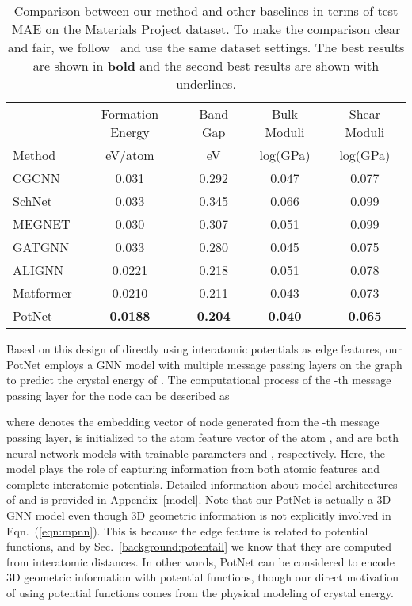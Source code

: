 \documentclass[nohyperref]{article}
\theoremstyle{plain}
\theoremstyle{definition}
\theoremstyle{remark}
\begin{document}
\begin{table*}[t]
\caption{Comparison between our method and other baselines in terms of test MAE on the Materials Project dataset. To make the comparison clear and fair, we follow~\citet{yan2022periodic} and use the same dataset settings. The best results are shown in \textbf{bold} and the second best results are shown with \underline{underlines}.}
\label{tb:mp}
\begin{center}
\begin{tabular}{l|cccc}
\toprule
& Formation Energy & Band Gap & Bulk Moduli & Shear Moduli \\
\cmidrule(r){2-5}
Method & eV/atom  &  eV &  log(GPa) & log(GPa)  \\
\midrule
CGCNN & 0.031 & 0.292  & 0.047 &0.077 \\
SchNet & 0.033 & 0.345 & 0.066 & 0.099 \\
MEGNET & 0.030 & 0.307 & 0.051 & 0.099 \\
GATGNN & 0.033 & 0.280 & 0.045 & 0.075 \\
ALIGNN & 0.0221 & 0.218 & 0.051 & 0.078 \\
Matformer & \underline{0.0210} & \underline{0.211} & \underline{0.043} & \underline{0.073} \\
PotNet  & \textbf{0.0188} & \textbf{0.204} & \textbf{0.040} & \textbf{0.065} \\
\bottomrule
\end{tabular}
\end{center}
\vskip -0.25in
\end{table*}

Based on this design of directly using interatomic potentials as edge features, our PotNet employs a GNN model with multiple message passing layers on the graph  to predict the crystal energy of . The computational process of the -th message passing layer for the node  can be described as

where  denotes the embedding vector of node  generated from the -th message passing layer,  is initialized to the atom feature vector of the atom , and  are both neural network models with trainable parameters  and , respectively. Here, the model  plays the role of capturing information from both atomic features and complete interatomic potentials. Detailed information about model architectures of  and  is provided in Appendix~\ref{model}. Note that our PotNet is actually a 3D GNN model even though 3D geometric information is not explicitly involved in Eqn.~(\ref{eqn:mpnn}). This is because the edge feature  is related to potential functions, and by Sec.~\ref{background:potentail} we know that they are computed from interatomic distances. In other words, PotNet can be considered to encode 3D geometric information with potential functions, though our direct motivation of using potential functions comes from the physical modeling of crystal energy.
\end{document}

